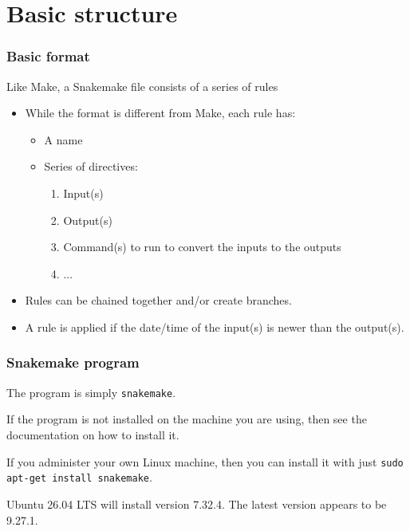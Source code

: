 \section{Basic structure}


\begin{frame}

\frametitle{Basic format}

Like Make, a Snakemake file consists of a series of rules
\begin{itemize}
  \item While the format is different from Make, each rule has:
    \begin{itemize}
      \item A name
      \item Series of directives:
      \begin{enumerate}
        \item Input(s)
        \item Output(s)
        \item Command(s) to run to convert the inputs to the outputs
        \item ...
      \end{enumerate}
    \end{itemize}
  \item Rules can be chained together and/or create branches.
  \item A rule is applied if the date/time of the input(s) is newer than the output(s).
\end{itemize}

\end{frame}


\begin{frame}

\frametitle{Snakemake program}

The program is simply {\texttt{snakemake}}.
\vs

If the program is not installed on the machine you are using, then see the documentation on how to install it.
\vs

If you administer your own Linux machine, then you can install it with just {\texttt{sudo apt-get install snakemake}}.
\vs

Ubuntu 26.04 LTS will install version 7.32.4.  The latest version appears to be 9.27.1.

\end{frame}



